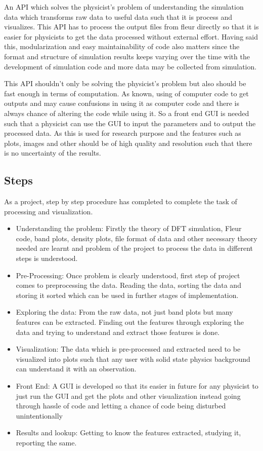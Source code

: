 An API which solves the physicist's problem of understanding the simulation data which transforms raw data to useful data such that it is process and visualizes. This API has to process the output files from fleur directly so that it is easier for physicists to get the data processed without external effort. Having said this, modularization and easy maintainability of code also matters since the format and structure of simulation results keeps varying over the time with the development of simulation code and more data may be collected from simulation.

This API shouldn't only be solving the physicist's problem but also should be fast enough in terms of computation. As known, using of computer code to get outputs and may cause confusions in using it as computer code and there is always chance of altering the code while using it. So a front end GUI is needed such that a physicist can use the GUI to input the parameters and to output the processed data. As this is used for research purpose and the features such as plots, images and other should be of high quality and resolution such that there is no uncertainty of the results.

\subsection{Steps}

As a project, step by step procedure has completed to complete the task of processing and visualization.
\begin{itemize}
\item Understanding the problem: Firstly the theory of DFT simulation, Fleur code, band plots, density plots, file format of data and other necessary theory needed are learnt and problem of the project to process the data in different steps is understood.
\item Pre-Processing: Once problem is clearly understood, first step of project comes to preprocessing the data. Reading the data, sorting the data and storing it sorted which can be used in further stages of implementation.
\item Exploring the data: From the raw data, not just band plots but many features can be extracted. Finding out the features through exploring the data and trying to understand and extract those features is done.
\item Visualization: The data which is pre-processed and extracted need to be visualized into plots such that any user with solid state physics background can understand it with an observation.
\item Front End: A GUI is developed so that its easier in future for any physicist to just run the GUI and get the plots and other visualization instead going through hassle of code and letting a chance of code being disturbed unintentionally
\item Results and lookup: Getting to know the features extracted, studying it, reporting the same.

\end{itemize}
